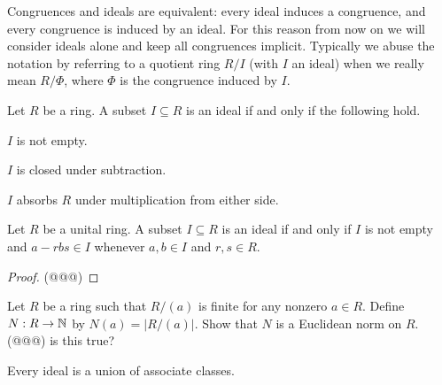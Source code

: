 Congruences and ideals are equivalent: every ideal induces a congruence, and every congruence is induced by an ideal.
For this reason from now on we will consider ideals alone and keep all congruences implicit.
Typically we abuse the notation by referring to a quotient ring \(R/I\) (with \(I\) an ideal) when we really mean \(R/\Phi\), where \(\Phi\) is the congruence induced by \(I\).

\begin{prop}
Let \(R\) be a ring.
A subset \(I \subseteq R\) is an ideal if and only if the following hold.
\begin{proplist*}
\item \(I\) is not empty.
\item \(I\) is closed under subtraction.
\item \(I\) absorbs \(R\) under multiplication from either side.
\end{proplist*}
\end{prop}

\begin{prop}
Let \(R\) be a unital ring.
A subset \(I \subseteq R\) is an ideal if and only if \(I\) is not empty and \(a - rbs \in I\) whenever \(a,b \in I\) and \(r,s \in R\).
\end{prop}

\begin{proof}
(@@@)
\end{proof}



\Exercises%

\begin{exercise}
Let \(R\) be a ring such that \(R/(a)\) is finite for any nonzero \(a \in R\).
Define \(N : R \rightarrow \mathbb{N}\) by \(N(a) = |R/(a)|\).
Show that \(N\) is a Euclidean norm on \(R\).
(@@@) is this true?
\end{exercise}

\begin{exercise}
Every ideal is a union of associate classes.
\end{exercise}

